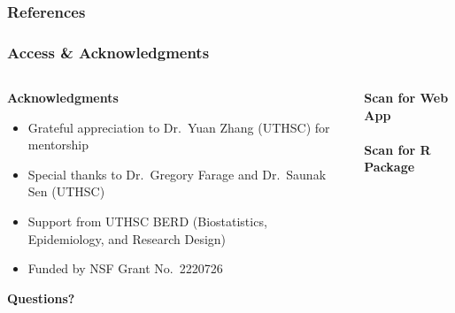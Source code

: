 \documentclass{beamer}
\begin{document}
\begin{frame}[allowframebreaks]
\frametitle{References}
\scriptsize


\end{frame}

\begin{frame}
\frametitle{Access \& Acknowledgments}
\begin{columns}[T]
\begin{column}{0.5\textwidth}
\scriptsize
    \textbf{Acknowledgments}
 \begin{itemize}
        \item Grateful appreciation to Dr.\ Yuan Zhang (UTHSC) for mentorship
        \item Special thanks to Dr.\ Gregory Farage and Dr.\ Saunak Sen (UTHSC)
        \item Support from UTHSC BERD (Biostatistics, Epidemiology, and Research Design)
        \item Funded by NSF Grant No.\ 2220726
    \end{itemize}
\vfill
\begin{center}
\Huge{\textbf{Questions?}}
\end{center}
\end{column}
    \begin{column}{0.5\textwidth}
    \scriptsize
        \centering
        \textbf{Scan for Web App} \\
        \vspace{2em} \\
        \textbf{Scan for R Package} \\
    \end{column}
\end{columns}
\end{frame}
\end{document}
